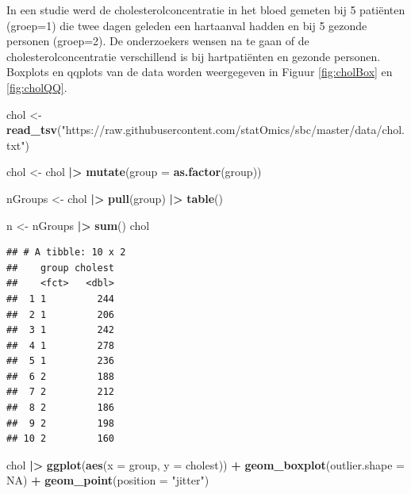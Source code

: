 \documentclass[
  12pt,dutch]{book}
\newenvironment{Shaded}{\begin{snugshade}}{\end{snugshade}}
\newcommand{\AttributeTok}[1]{\textcolor[rgb]{0.13,0.29,0.53}{#1}}
\newcommand{\ConstantTok}[1]{\textcolor[rgb]{0.56,0.35,0.01}{#1}}
\newcommand{\FunctionTok}[1]{\textcolor[rgb]{0.13,0.29,0.53}{\textbf{#1}}}
\newcommand{\NormalTok}[1]{#1}
\newcommand{\OtherTok}[1]{\textcolor[rgb]{0.56,0.35,0.01}{#1}}
\newcommand{\SpecialCharTok}[1]{\textcolor[rgb]{0.81,0.36,0.00}{\textbf{#1}}}
\newcommand{\StringTok}[1]{\textcolor[rgb]{0.31,0.60,0.02}{#1}}
\theoremstyle{definition}
\theoremstyle{definition}
\theoremstyle{definition}
\theoremstyle{definition}
\theoremstyle{remark}
\begin{document}
In een studie werd de cholesterolconcentratie in het bloed gemeten bij 5 patiënten (groep=1) die twee dagen geleden een hartaanval hadden en bij 5 gezonde personen (groep=2).
De onderzoekers wensen na te gaan of de cholesterolconcentratie verschillend is bij hartpatiënten en gezonde personen.
Boxplots en qqplots van de data worden weergegeven in Figuur \ref{fig:cholBox} en \ref{fig:cholQQ}.

\begin{Shaded}
\begin{Highlighting}[]
\NormalTok{chol }\OtherTok{\textless{}{-}} \FunctionTok{read\_tsv}\NormalTok{(}\StringTok{"https://raw.githubusercontent.com/statOmics/sbc/master/data/chol.txt"}\NormalTok{)}

\NormalTok{chol }\OtherTok{\textless{}{-}}\NormalTok{ chol }\SpecialCharTok{|\textgreater{}}
    \FunctionTok{mutate}\NormalTok{(}\AttributeTok{group =} \FunctionTok{as.factor}\NormalTok{(group))}

\NormalTok{nGroups }\OtherTok{\textless{}{-}}\NormalTok{ chol }\SpecialCharTok{|\textgreater{}}
    \FunctionTok{pull}\NormalTok{(group) }\SpecialCharTok{|\textgreater{}}
    \FunctionTok{table}\NormalTok{()}

\NormalTok{n }\OtherTok{\textless{}{-}}\NormalTok{ nGroups }\SpecialCharTok{|\textgreater{}}
    \FunctionTok{sum}\NormalTok{()}
\NormalTok{chol}
\end{Highlighting}
\end{Shaded}

\begin{verbatim}
## # A tibble: 10 x 2
##    group cholest
##    <fct>   <dbl>
##  1 1         244
##  2 1         206
##  3 1         242
##  4 1         278
##  5 1         236
##  6 2         188
##  7 2         212
##  8 2         186
##  9 2         198
## 10 2         160
\end{verbatim}

\begin{Shaded}
\begin{Highlighting}[]
\NormalTok{chol }\SpecialCharTok{|\textgreater{}}
    \FunctionTok{ggplot}\NormalTok{(}\FunctionTok{aes}\NormalTok{(}\AttributeTok{x =}\NormalTok{ group, }\AttributeTok{y =}\NormalTok{ cholest)) }\SpecialCharTok{+} \FunctionTok{geom\_boxplot}\NormalTok{(}\AttributeTok{outlier.shape =} \ConstantTok{NA}\NormalTok{) }\SpecialCharTok{+}
    \FunctionTok{geom\_point}\NormalTok{(}\AttributeTok{position =} \StringTok{"jitter"}\NormalTok{)}
\end{Highlighting}
\end{Shaded}
\end{document}
